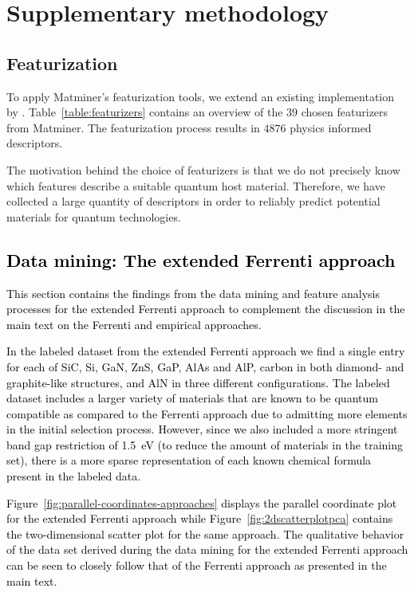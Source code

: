 \documentclass[superscriptaddress,unsortedaddress,
 amsmath,amssymb,
 aps,
]{revtex4-2}
\newcommand{\mrk}[1]{\textcolor{black}{#1}}
\begin{document}
\newpage 

\section*{Supplementary methodology}
\subsection*{Featurization}
To apply Matminer's featurization tools, we extend an existing implementation by \citeauthor{Breuck2021} \cite{Breuck2021}. 
Table~\ref{table:featurizers} contains an overview of the $39$ chosen featurizers from Matminer. The featurization process results in $4876$ physics informed descriptors. 

The motivation behind the choice of featurizers is that we do not precisely know which features describe a suitable quantum host material. Therefore, we have collected a large quantity of descriptors in order to reliably  predict potential materials for quantum technologies. 




\subsection*{\mrk{Data mining: The extended Ferrenti approach}} 

\mrk{This section contains the findings from the data mining and feature analysis processes for the extended Ferrenti approach to complement the discussion in the main text on the Ferrenti and empirical approaches.}  

\mrk{In the labeled dataset from the extended Ferrenti approach we find a single entry for each of SiC, Si, GaN, ZnS, GaP, AlAs and AlP, carbon in both diamond- and graphite-like structures, and AlN in three different configurations. The labeled dataset includes a larger variety of materials that are known to be quantum compatible as compared to the Ferrenti approach due to admitting more elements in the initial selection process. However, since we also included a more stringent band gap restriction of \SI{1.5}{\electronvolt} (to reduce the amount of materials in the training set), there is a more sparse representation of each known chemical formula present in the labeled data. }

\mrk{Figure~\ref{fig:parallel-coordinates-approaches} displays the parallel coordinate plot for the extended Ferrenti approach while  Figure~\ref{fig:2dscatterplotpca} contains the two-dimensional scatter plot for the same approach. The qualitative behavior of the data set derived during the data mining for the extended Ferrenti approach can be seen to closely follow that of the Ferrenti approach as presented in the main text.} 
\end{document}
